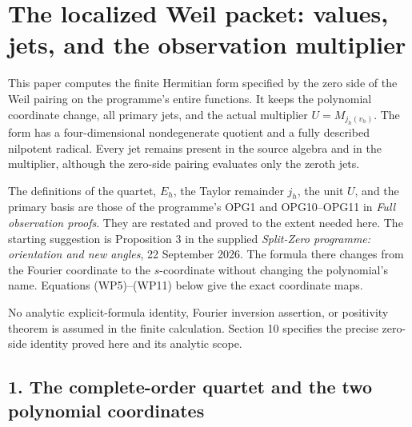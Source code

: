 \documentclass[
  10pt,
  a4paper,
]{article}
\author{}
\date{}
\begin{document}
{
\setcounter{tocdepth}{3}
\tableofcontents
}
\section{The localized Weil packet: values, jets, and the observation
multiplier}\label{the-localized-weil-packet-values-jets-and-the-observation-multiplier}

This paper computes the finite Hermitian form specified by the zero side
of the Weil pairing on the programme's entire functions. It keeps the
polynomial coordinate change, all primary jets, and the actual
multiplier \(U=M_{j_h(v_h)}\). The form has a four-dimensional
nondegenerate quotient and a fully described nilpotent radical. Every
jet remains present in the source algebra and in the multiplier,
although the zero-side pairing evaluates only the zeroth jets.

The definitions of the quartet, \(E_h\), the Taylor remainder \(j_h\),
the unit \(U\), and the primary basis are those of the programme's OPG1
and OPG10--OPG11 in \emph{Full observation proofs}. They are restated
and proved to the extent needed here. The starting suggestion is
Proposition 3 in the supplied \emph{Split-Zero programme: orientation
and new angles}, 22 September 2026. The formula there changes from the
Fourier coordinate to the \(s\)-coordinate without changing the
polynomial's name. Equations (WP5)--(WP11) below give the exact
coordinate maps.

No analytic explicit-formula identity, Fourier inversion assertion, or
positivity theorem is assumed in the finite calculation. Section 10
specifies the precise zero-side identity proved here and its analytic
scope.

\subsection{1. The complete-order quartet and the two polynomial
coordinates}\label{the-complete-order-quartet-and-the-two-polynomial-coordinates}
\end{document}
